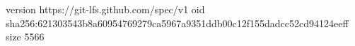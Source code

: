 version https://git-lfs.github.com/spec/v1
oid sha256:621303543b8a60954769279ca5967a9351ddb00c12f155dadcc52cd94124eeff
size 5566
